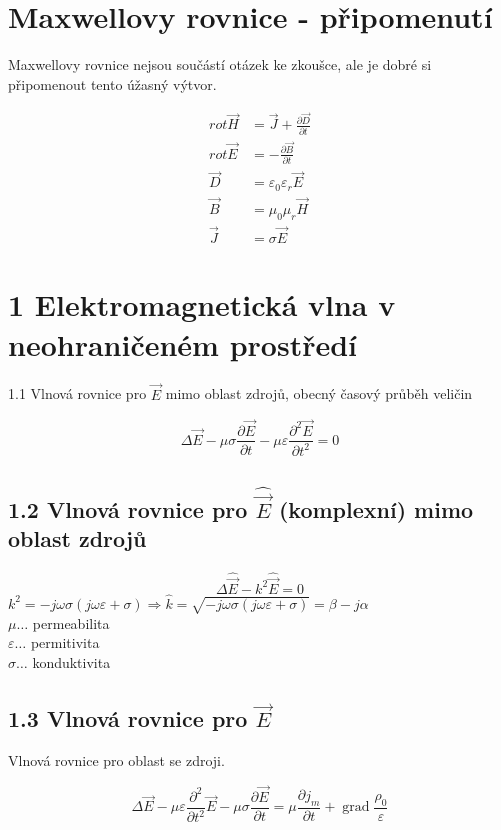 \documentclass[10pt]{article}
\begin{document}
\section*{Maxwellovy rovnice - připomenutí}
Maxwellovy rovnice nejsou součástí otázek ke zkoušce, ale je dobré si připomenout tento úžasný výtvor.

$$
\begin{aligned}
r o t \vec{H} & =\vec{J}+\frac{\partial \vec{D}}{\partial t} \\
r o t \vec{E} & =-\frac{\partial \vec{B}}{\partial t} \\
\vec{D} & =\varepsilon_{0} \varepsilon_{r} \vec{E} \\
\vec{B} & =\mu_{0} \mu_{r} \vec{H} \\
\vec{J} & =\sigma \vec{E}
\end{aligned}
$$

\section*{1 Elektromagnetická vlna v neohraničeném prostředí}
1.1 Vlnová rovnice pro $\vec{E}$ mimo oblast zdrojů, obecný časový průběh veličin

$$
\Delta \vec{E}-\mu \sigma \frac{\partial \vec{E}}{\partial t}-\mu \varepsilon \frac{\partial^{2} \vec{E}}{\partial t^2}=0
$$

\subsection*{1.2 Vlnová rovnice pro $\hat{\vec{E}}$ (komplexní) mimo oblast zdrojů}
$$
\Delta \hat{\vec{E}}-k^{2} \hat{\vec{E}}=0
$$
$k^{2}=-j \omega \sigma(j \omega \varepsilon+\sigma) \Rightarrow \hat{k}=\sqrt{-j \omega \sigma(j \omega \varepsilon+\sigma)}=\beta-j \alpha$\\
$\mu \ldots$ permeabilita\\
$\varepsilon \ldots$ permitivita\\
$\sigma \ldots$ konduktivita

\subsection*{1.3 Vlnová rovnice pro $\vec{E}$}
Vlnová rovnice pro oblast se zdroji.

$$
\Delta \vec{E}-\mu \varepsilon \frac{\partial^{2}}{\partial t^{2}} \vec{E}-\mu \sigma \frac{\partial \vec{E}}{\partial t}=\mu \frac{\partial j_{m}}{\partial t}+\operatorname{grad} \frac{\rho_{0}}{\varepsilon}
$$
\end{document}
